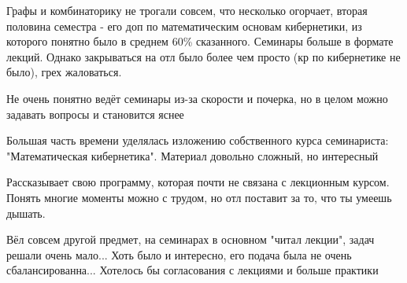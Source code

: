             \begin{commentbox} 
                Графы и комбинаторику не трогали совсем, что несколько огорчает, вторая половина семестра - его доп по математическим основам кибернетики, из которого понятно было в среднем 60\% сказанного. Семинары больше в формате лекций. Однако закрываться на отл было более чем просто (кр по кибернетике не было), грех жаловаться. 
            \end{commentbox} 
            
            \begin{commentbox} 
                Не очень понятно ведёт семинары из-за скорости и почерка, но в целом можно задавать вопросы и становится яснее 
            \end{commentbox} 
            
            \begin{commentbox} 
                Большая часть времени уделялась изложению собственного курса семинариста: "Математическая кибернетика". Материал довольно сложный, но интересный 
            \end{commentbox} 
            
            \begin{commentbox} 
                Рассказывает свою программу, которая почти не связана с лекционным курсом. Понять многие моменты можно с трудом, но отл поставит за то, что ты умеешь дышать.  
            \end{commentbox} 
            
            \begin{commentbox} 
                Вёл совсем другой предмет, на семинарах в основном "читал лекции", задач решали очень мало... Хоть было и интересно, его подача была не очень сбалансированна... Хотелось бы согласования с лекциями и больше практики 
            \end{commentbox} 


